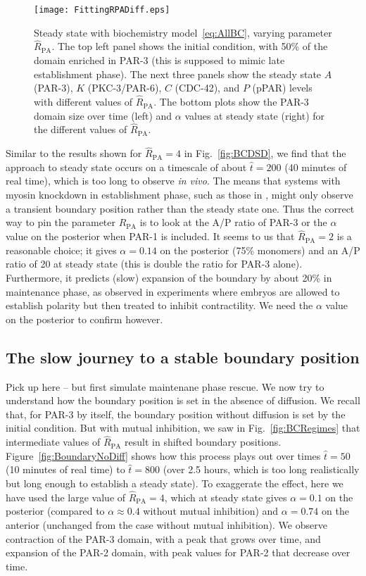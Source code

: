 \documentclass[11pt]{article}
\newcommand{\red}[1]{\color{red}#1\normalcolor}
\newcommand{\6}[1]{#1_{\text{6}}}
\newcommand{\3}[1]{#1_{\text{3}}}
\begin{document}
\begin{figure}
\centering
\texttt{[image: FittingRPADiff.eps]}
\caption{\label{fig:BCSS}Steady state with biochemistry model\ \eqref{eq:AllBC}, varying parameter $\hat R_\text{PA}$. The top left panel shows the initial condition, with 50\% of the domain enriched in PAR-3 (this is supposed to mimic late establishment phase). The next three panels show the steady state $A$ (PAR-3), $K$ (PKC-3/PAR-6), $C$ (CDC-42), and $P$ (pPAR) levels with different values of $\hat R_\text{PA}$. The bottom plots show the PAR-3 domain size over time (left) and $\alpha$ values at steady state (right) for the different values of $\hat R_\text{PA}$. }
\end{figure}

Similar to the results shown for $\hat R_\text{PA}=4$ in Fig.\ \ref{fig:BCDSD}, we find that the approach to steady state occurs on a timescale of about $\hat t = 200$ (40 minutes of real time), which is too long to observe \emph{in vivo}. The means that systems with myosin knockdown in establishment phase, such as those in \cite{zonies2010symmetry}, might only observe a transient boundary position rather than the steady state one. Thus the correct way to pin the parameter $\hat R_\text{PA}$ is to look at the A/P ratio of PAR-3 or the $\alpha$ value on the posterior when PAR-1 is included. It seems to us that $\hat R_\text{PA}=2$ is a reasonable choice; it gives $\alpha=0.14$ on the posterior (75\% monomers) and an A/P ratio of 20 at steady state (this is double the ratio for PAR-3 alone). Furthermore, it predicts (slow) expansion of the boundary by about 20\% in maintenance phase, as observed in experiments where embryos are allowed to establish polarity but then treated to inhibit contractility. \red{We need the $\alpha$ value on the posterior to confirm however.}

\subsection{The slow journey to a stable boundary position}
\red{Pick up here -- but first simulate maintenane phase rescue.} We now try to understand how the boundary position is set in the absence of diffusion. We recall that, for PAR-3 by itself, the boundary position without diffusion is set by the initial condition. But with mutual inhibition, we saw in Fig.\ \ref{fig:BCRegimes} that intermediate values of $\hat R_\text{PA}$ result in shifted boundary positions. Figure\ \ref{fig:BoundaryNoDiff} shows how this process plays out over times $\hat t = 50$ (10 minutes of real time) to $\hat t = 800$ (over 2.5 hours, which is too long realistically but long enough to establish a steady state). To exaggerate the effect, here we have used the large value of $\hat R_\text{PA}=4$, which at steady state gives $\alpha=0.1$ on the posterior (compared to $\alpha \approx 0.4$ without mutual inhibition) and $\alpha=0.74$ on the anterior (unchanged from the case without mutual inhibition). We observe contraction of the PAR-3 domain, with a peak that grows over time, and expansion of the PAR-2 domain, with peak values for PAR-2 that decrease over time. 
\end{document}
